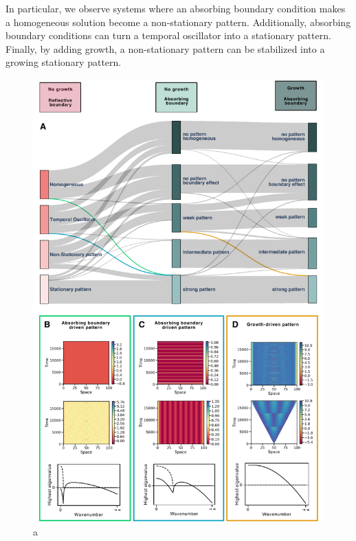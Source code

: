 In particular, we observe systems where an absorbing boundary condition makes a homogeneous solution become a non-stationary pattern. Additionally, absorbing boundary conditions can turn a temporal oscillator into a stationary pattern. Finally, by adding growth, a non-stationary pattern can be stabilized into a growing stationary pattern.
\begin{figure}[H]
    \includegraphics[width=1\textwidth]{figures/boundaries_growth} %
    \caption{a}
    \label{fig:boundariesgrowth} %
\end{figure}


